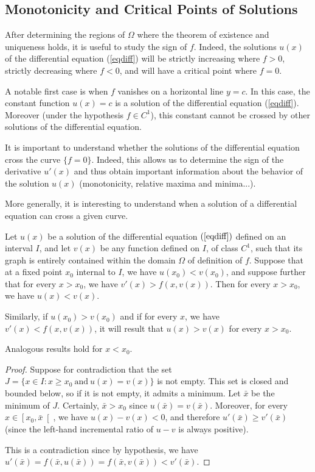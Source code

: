 \subsection{Monotonicity and Critical Points of Solutions}

After determining the regions of $\Omega$ where the theorem of existence and
uniqueness holds, it is useful to study the sign of $f$. Indeed, the solutions
$u(x)$ of the differential equation (\ref{eqdiff}) will be strictly increasing
where $f>0$, strictly decreasing where $f<0$, and will have a critical point
where $f=0$.

A notable first case is when $f$ vanishes on a horizontal line $y=c$. In this
case, the constant function $u(x)=c$ is a solution of the differential equation
(\ref{eqdiff}). Moreover (under the hypothesis $f\in C^1$), this constant cannot
be crossed by other solutions of the differential equation.

It is important to understand whether the solutions of the differential equation
cross the curve $\{f=0\}$. Indeed, this allows us to determine the sign of the
derivative $u'(x)$ and thus obtain important information about the behavior of
the solution $u(x)$ (monotonicity, relative maxima and minima...).

More generally, it is interesting to understand when a solution of a
differential equation can cross a given curve.

\begin{theorem}\label{nonpassa}
Let $u(x)$ be a solution of the differential equation $(\ref{eqdiff})$ defined
on an interval $I$, and let $v(x)$ be any function defined on $I$, of class
$C^1$, such that its graph is entirely contained within the domain $\Omega$ of
definition of $f$. Suppose that at a fixed point $x_0$ internal to $I$, we have
$u(x_0)<v(x_0)$, and suppose further that for every $x>x_0$, we have
$v'(x)>f(x,v(x))$. Then for every $x>x_0$, we have $u(x)<v(x)$.

Similarly, if $u(x_0)>v(x_0)$ and if for every $x$, we have $v'(x)<f(x,v(x))$,
it will result that $u(x)>v(x)$ for every $x>x_0$.

Analogous results hold for $x<x_0$.
\end{theorem}

\begin{proof}
Suppose for contradiction that the set $J=\{x\in I: x\ge x_0\ \mathrm{and}\
u(x)=v(x)\}$ is not empty. This set is closed and bounded below, so if it is not
empty, it admits a minimum. Let $\bar x$ be the minimum of $J$. Certainly, $\bar
x>x_0$ since $u(\bar x)=v(\bar x)$. Moreover, for every $x\in \left[x_0,\bar
x\right[$, we have $u(x)-v(x)<0$, and therefore $u'(\bar x) \ge v'(\bar x)$
(since the left-hand incremental ratio of $u-v$ is always positive).

This is a contradiction since by hypothesis, we have $u'(\bar x) = f(\bar x,
u(\bar x)) = f(\bar x ,v(\bar x)) < v'(\bar x)$.
\end{proof}

